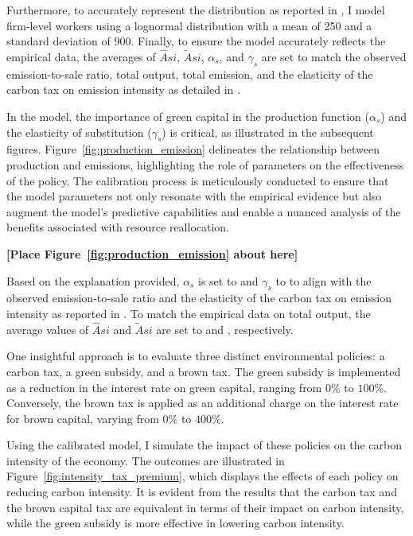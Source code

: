 Furthermore, to accurately represent the distribution as reported in \cite{martinsson2024effect}, I model firm-level workers using a lognormal distribution with a mean of 250 and a standard deviation of 900. Finally, to ensure the model accurately reflects the empirical data, the averages of $\hat{A}{si}$, $\tilde{A}{si}$, $\alpha_s$, and $\gamma_s$ are set to match the observed emission-to-sale ratio, total output, total emission, and the elasticity of the carbon tax on emission intensity as detailed in \cite{martinsson2024effect}.

In the model, the importance of green capital in the production function ($\alpha_s$) and the elasticity of substitution ($\gamma_s$) is critical, as illustrated in the subsequent figures. Figure~\ref{fig:production_emission} delineates the relationship between production and emissions, highlighting the role of parameters on the effectiveness of the policy. The calibration process is meticulously conducted to ensure that the model parameters not only resonate with the empirical evidence but also augment the model's predictive capabilities and enable a nuanced analysis of the benefits associated with resource reallocation.

\bigskip
\centerline{\bf [Place Figure~\ref{fig:production_emission} about here]}
\bigskip


Based on the explanation provided, $\alpha_s$ is set to  and $\gamma_s$ to  to align with the observed emission-to-sale ratio and the elasticity of the carbon tax on emission intensity as reported in \cite{martinsson2024effect}. To match the empirical data on total output, the average values of $\hat{A}{si}$ and $\tilde{A}{si}$ are set to  and , respectively.

One insightful approach is to evaluate three distinct environmental policies: a carbon tax, a green subsidy, and a brown tax. The green subsidy is implemented as a reduction in the interest rate on green capital, ranging from $0\%$ to $100\%$. Conversely, the brown tax is applied as an additional charge on the interest rate for brown capital, varying from $0\%$ to $400\%$. 

Using the calibrated model, I simulate the impact of these policies on the carbon intensity of the economy. The outcomes are illustrated in Figure~\ref{fig:intensity_tax_premium}, which displays the effects of each policy on reducing carbon intensity. It is evident from the results that the carbon tax and the brown capital tax are equivalent in terms of their impact on carbon intensity, while the green subsidy is more effective in lowering carbon intensity. 

